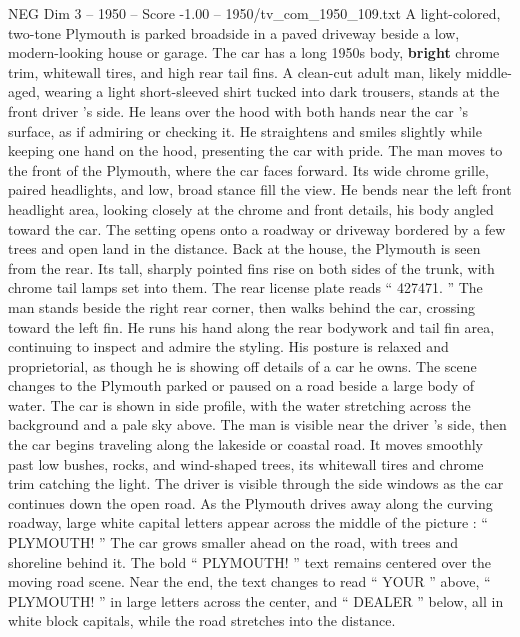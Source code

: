 \begin{textsample}{NEG Dim 3 – 1950 – Score -1.00 – 1950/tv\_com\_1950\_109.txt}  \label{ex:f3_neg_081}
A light-colored, two-tone Plymouth is parked broadside in a paved driveway beside a low, modern-looking house or garage.
The car has a long 1950s body, \textbf{bright} chrome trim, whitewall tires, and high rear tail fins.
A clean-cut adult man, likely middle-aged, wearing a light short-sleeved shirt tucked into dark trousers, stands at the front driver ’s side.
He leans over the hood with both hands near the car ’s surface, as if admiring or checking it.
He straightens and smiles slightly while keeping one hand on the hood, presenting the car with pride.
The man moves to the front of the Plymouth, where the car faces forward.
Its wide chrome grille, paired headlights, and low, broad stance fill the view.
He bends near the left front headlight area, looking closely at the chrome and front details, his body angled toward the car.
The setting opens onto a roadway or driveway bordered by a few trees and open land in the distance.
Back at the house, the Plymouth is seen from the rear.
Its tall, sharply pointed fins rise on both sides of the trunk, with chrome tail lamps set into them.
The rear license plate reads “ 427471. ” The man stands beside the right rear corner, then walks behind the car, crossing toward the left fin.
He runs his hand along the rear bodywork and tail fin area, continuing to inspect and admire the styling.
His posture is relaxed and proprietorial, as though he is showing off details of a car he owns.
The scene changes to the Plymouth parked or paused on a road beside a large body of water.
The car is shown in side profile, with the water stretching across the background and a pale sky above.
The man is visible near the driver ’s side, then the car begins traveling along the lakeside or coastal road.
It moves smoothly past low bushes, rocks, and wind-shaped trees, its whitewall tires and chrome trim catching the light.
The driver is visible through the side windows as the car continues down the open road.
As the Plymouth drives away along the curving roadway, large white capital letters appear across the middle of the picture : “ PLYMOUTH! ” The car grows smaller ahead on the road, with trees and shoreline behind it.
The bold “ PLYMOUTH! ” text remains centered over the moving road scene.
Near the end, the text changes to read “ YOUR ” above, “ PLYMOUTH! ” in large letters across the center, and “ DEALER ” below, all in white block capitals, while the road stretches into the distance.

\end{textsample}
